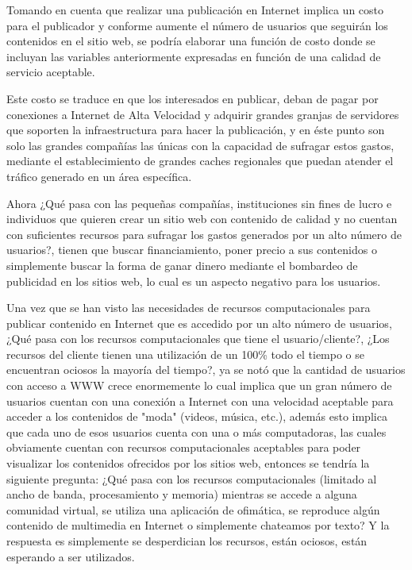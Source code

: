 Tomando en cuenta que realizar una publicación en Internet implica un costo para el publicador y conforme aumente el número de usuarios  que seguirán los contenidos en el sitio web, se podría elaborar una función de costo donde se incluyan las variables anteriormente expresadas en función de una calidad de servicio aceptable.

Este costo se traduce en que los interesados en publicar, deban de pagar por conexiones a Internet de Alta Velocidad y adquirir grandes granjas de servidores que soporten la infraestructura para hacer la publicación, y en éste punto son solo las grandes compañías las  únicas con la capacidad de sufragar estos gastos, mediante el establecimiento de grandes caches regionales que puedan atender el tráfico generado en un área específica.

Ahora ¿Qué pasa con las pequeñas compañías, instituciones sin fines de lucro e individuos que quieren crear un sitio web con contenido de calidad y no cuentan con suficientes recursos para sufragar los gastos generados por un alto número de usuarios?, tienen que buscar financiamiento, poner precio a sus contenidos o simplemente buscar la forma de ganar dinero mediante el bombardeo de publicidad en los sitios web, lo cual es un aspecto negativo para los usuarios.

Una vez que se han visto las necesidades de recursos computacionales para publicar contenido en Internet que es accedido por un alto número de usuarios, ¿Qué pasa con los recursos computacionales que tiene el usuario/cliente?, ¿Los recursos del cliente tienen una utilización de un 100\% todo el tiempo o se encuentran ociosos la mayoría del tiempo?, ya se notó que la cantidad de usuarios con acceso a WWW crece enormemente lo cual implica que un gran número de usuarios cuentan con una conexión a Internet con una velocidad aceptable para acceder a los contenidos de "moda" (videos, música, etc.), además esto implica que cada uno de esos usuarios cuenta con una o más computadoras, las cuales obviamente cuentan con recursos computacionales aceptables para poder visualizar los contenidos ofrecidos por los sitios web, entonces se tendría la siguiente pregunta: ¿Qué pasa con los recursos computacionales (limitado al ancho de banda, procesamiento y memoria) mientras se accede a alguna comunidad virtual, se utiliza una aplicación de ofimática, se reproduce algún contenido de multimedia en Internet o simplemente chateamos por texto?  Y la respuesta es simplemente se desperdician los recursos, están ociosos, están esperando a ser utilizados.

